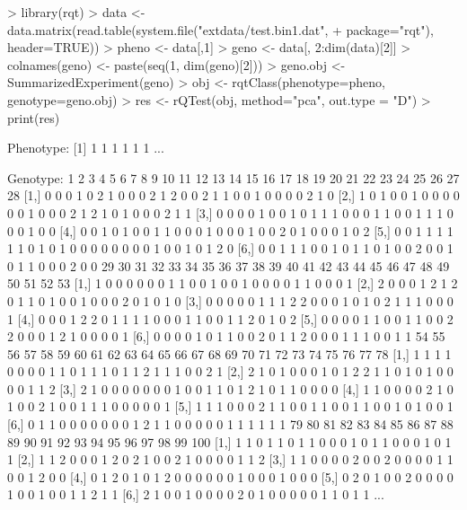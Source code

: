 \documentclass{article}
\begin{document}
\begin{Schunk}
\begin{Sinput}
> library(rqt)
> data <- data.matrix(read.table(system.file("extdata/test.bin1.dat",
+                                            package="rqt"), header=TRUE))
> pheno <- data[,1]
> geno <- data[, 2:dim(data)[2]]
> colnames(geno) <- paste(seq(1, dim(geno)[2]))
> geno.obj <- SummarizedExperiment(geno)
> obj <- rqtClass(phenotype=pheno, genotype=geno.obj)
> res <- rQTest(obj, method="pca", out.type = "D")
> print(res)
\end{Sinput}
\begin{Soutput}
Phenotype:
[1] 1 1 1 1 1 1
...

Genotype:
     1 2 3 4 5 6 7 8 9 10 11 12 13 14 15 16 17 18 19 20 21 22 23 24 25 26 27 28
[1,] 0 0 0 1 0 2 1 0 0  0  2  1  2  0  0  2  1  1  0  0  1  0  0  0  0  2  1  0
[2,] 1 0 1 0 0 1 0 0 0  0  0  0  1  0  0  0  2  1  2  1  0  1  0  0  0  2  1  1
[3,] 0 0 0 0 1 0 0 1 0  1  1  1  0  0  0  1  1  0  0  1  1  1  0  0  0  1  0  0
[4,] 0 0 1 0 1 0 0 1 1  0  0  0  1  0  0  0  1  0  0  2  0  1  0  0  0  1  0  2
[5,] 0 0 1 1 1 1 1 1 0  1  0  1  0  0  0  0  0  0  0  0  1  0  0  1  0  1  2  0
[6,] 0 0 1 1 1 0 0 1 0  1  1  0  1  0  0  2  0  0  1  0  1  1  0  0  0  2  0  0
     29 30 31 32 33 34 35 36 37 38 39 40 41 42 43 44 45 46 47 48 49 50 51 52 53
[1,]  1  0  0  0  0  0  0  1  1  0  0  1  0  0  1  0  0  0  0  1  1  0  0  0  1
[2,]  2  0  0  0  1  2  1  2  0  1  1  0  1  0  0  1  0  0  0  2  0  1  0  1  0
[3,]  0  0  0  0  0  1  1  1  2  2  0  0  0  1  0  1  0  2  1  1  1  0  0  0  1
[4,]  0  0  0  1  2  2  0  1  1  1  1  0  0  0  1  1  0  0  1  1  2  0  1  0  2
[5,]  0  0  0  0  1  1  0  0  1  1  0  0  2  2  0  0  0  1  2  1  0  0  0  0  1
[6,]  0  0  0  0  1  0  1  1  0  0  2  0  1  1  2  0  0  0  1  1  1  0  0  1  1
     54 55 56 57 58 59 60 61 62 63 64 65 66 67 68 69 70 71 72 73 74 75 76 77 78
[1,]  1  1  1  1  0  0  0  0  1  1  0  1  1  1  0  1  1  2  1  1  1  0  0  2  1
[2,]  2  1  0  1  0  0  0  1  0  1  2  2  1  1  0  1  0  1  0  0  0  0  1  1  2
[3,]  2  1  0  0  0  0  0  0  0  1  0  0  1  1  0  1  2  1  0  1  1  0  0  0  0
[4,]  1  1  0  0  0  0  2  1  0  1  0  0  2  1  0  0  1  1  1  0  0  0  0  0  1
[5,]  1  1  1  0  0  0  2  1  1  0  0  1  1  0  0  1  1  0  0  1  0  1  0  0  1
[6,]  0  1  1  0  0  0  0  0  0  0  1  2  1  1  0  0  0  0  0  1  1  1  1  1  1
     79 80 81 82 83 84 85 86 87 88 89 90 91 92 93 94 95 96 97 98 99 100
[1,]  1  1  0  1  1  0  1  1  0  0  0  1  0  1  1  0  0  0  1  0  1   1
[2,]  1  1  2  0  0  0  1  2  0  2  1  0  0  2  1  0  0  0  0  1  1   2
[3,]  1  1  0  0  0  0  2  0  0  2  0  0  0  0  1  1  0  0  1  2  0   0
[4,]  0  1  2  0  1  0  1  2  0  0  0  0  0  0  1  0  0  0  1  0  0   0
[5,]  0  2  0  1  0  0  2  0  0  0  0  1  0  0  1  0  0  1  1  2  1   1
[6,]  2  1  0  0  1  0  0  0  0  2  0  1  0  0  0  0  0  1  1  0  1   1
...


\end{Soutput}
\end{Schunk}
\end{document}
